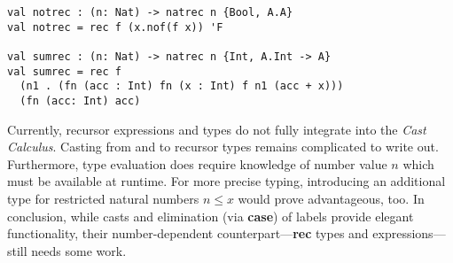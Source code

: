 \begin{lstlisting}[float, language=ldgv,
	caption=Example usage of \rec expression and type,
	label=lst:rec-ldgv-example]
val notrec : (n: Nat) -> natrec n {Bool, A.A}
val notrec = rec f (x.nof(f x)) 'F

val sumrec : (n: Nat) -> natrec n {Int, A.Int -> A}
val sumrec = rec f
  (n1 . (fn (acc : Int) fn (x : Int) f n1 (acc + x)))
  (fn (acc: Int) acc)
\end{lstlisting}

Currently, recursor expressions and types do not fully integrate into the \emph{Cast Calculus}. Casting from and to recursor types remains complicated to write out. Furthermore, type evaluation does require knowledge of number value $n$ which must be available at runtime. For more precise typing, introducing an additional type for restricted natural numbers $n \leq x$ would prove advantageous, too. In conclusion, while casts and elimination (via \textbf{case}) of labels provide elegant functionality, their number-dependent counterpart---\textbf{rec} types and expressions---still needs some work.